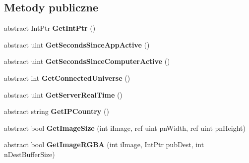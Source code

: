 \subsection*{Metody publiczne}
\begin{DoxyCompactItemize}
\item 
\mbox{\label{class_valve_1_1_steamworks_1_1_i_steam_utils_a8af14674c875ff89988955c889a80fc3}} 
abstract Int\+Ptr {\bfseries Get\+Int\+Ptr} ()
\item 
\mbox{\label{class_valve_1_1_steamworks_1_1_i_steam_utils_a449a1dde908b6de6dc1e81ec185d4fb5}} 
abstract uint {\bfseries Get\+Seconds\+Since\+App\+Active} ()
\item 
\mbox{\label{class_valve_1_1_steamworks_1_1_i_steam_utils_a7163a6bfe167236bc430868d4328163e}} 
abstract uint {\bfseries Get\+Seconds\+Since\+Computer\+Active} ()
\item 
\mbox{\label{class_valve_1_1_steamworks_1_1_i_steam_utils_add1db15ce15e9e64ed275545d48a1154}} 
abstract int {\bfseries Get\+Connected\+Universe} ()
\item 
\mbox{\label{class_valve_1_1_steamworks_1_1_i_steam_utils_a38c6160184d320f86eb0e80e935e7bfb}} 
abstract uint {\bfseries Get\+Server\+Real\+Time} ()
\item 
\mbox{\label{class_valve_1_1_steamworks_1_1_i_steam_utils_a1cd69463ef0092debe8a5fef2b21a3cd}} 
abstract string {\bfseries Get\+I\+P\+Country} ()
\item 
\mbox{\label{class_valve_1_1_steamworks_1_1_i_steam_utils_aa133367f000ad794b9fb60360437e75b}} 
abstract bool {\bfseries Get\+Image\+Size} (int i\+Image, ref uint pn\+Width, ref uint pn\+Height)
\item 
\mbox{\label{class_valve_1_1_steamworks_1_1_i_steam_utils_ac3ee90f8e3f44238a060c3be91c64284}} 
abstract bool {\bfseries Get\+Image\+R\+G\+BA} (int i\+Image, Int\+Ptr pub\+Dest, int n\+Dest\+Buffer\+Size)

\end{DoxyCompactItemize}
